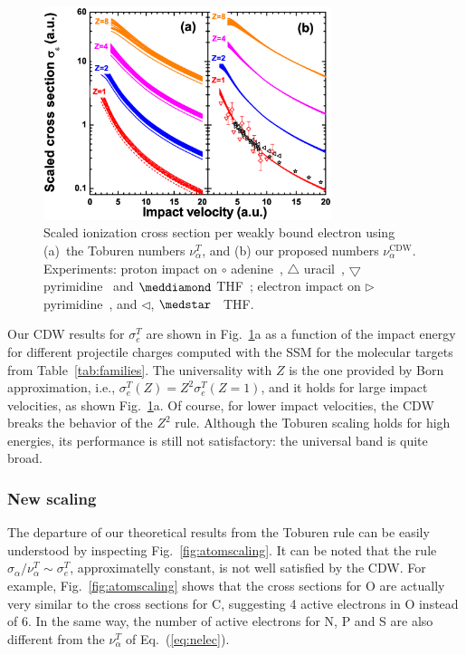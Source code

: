 \documentclass[preprint,12pt]{article}
\begin{document}
\begin{figure}[t!]
\centering
\includegraphics[width=0.75\textwidth]{figuras/Fig_finales/fig4.eps}
\caption{Scaled ionization cross section per weakly bound electron using
(a)~the Toburen numbers $\nu_{\alpha}^T$, and (b) our proposed numbers
$\nu_{\alpha}^{\text{CDW}}$. Experiments: proton impact on 
$\circ$ adenine~\cite{iriki2011}, $\triangle$ uracil~\cite{itoh2013}, 
$\bigtriangledown$ pyrimidine~\cite{wolff2014} and $\meddiamond$ 
THF~\cite{wang2016}; electron impact on $\rhd$ pyrimidine~\cite{bug2017},
and $\lhd$, $\medstar$~\cite{wolf2019,fuss2009} THF.}
\label{fig:newscaling}
\end{figure}

Our CDW results for $\sigma_{e}^T$ are shown in 
Fig.~\ref{fig:newscaling}a as a function of 
the impact energy for different projectile charges computed with the 
SSM for the molecular targets from Table~\ref{tab:families}. 
The universality with $Z$ is the one provided 
by Born approximation, i.e., $\sigma_{e}^T(Z)=Z^{2}\sigma_{e}^T(Z=1)$, 
and it holds for large impact velocities, as shown 
Fig.~\ref{fig:newscaling}a.
Of course, for lower impact velocities, the CDW breaks the behavior of 
the $Z^{2}$ rule. Although the Toburen scaling holds for high energies, 
its performance is still not satisfactory: the universal band is quite 
broad. 

\subsubsection{New scaling}

The departure of our theoretical 
results from the Toburen rule can be easily understood %
by inspecting Fig.~\ref{fig:atomscaling}. It can be noted that the 
rule $\sigma_{\alpha}/\nu_{\alpha}^T\sim \sigma_{e}^T$, approximatelly 
constant, is not well satisfied by the CDW. 
For example, Fig.~\ref{fig:atomscaling} shows that the cross sections
for O are actually very similar to the cross sections for C, suggesting 
4 active electrons in O instead of 6. In the same way, the number of
active electrons for N, P and S are also different from the 
$\nu_{\alpha}^T$ of Eq.~(\ref{eq:nelec}). 
\end{document}
